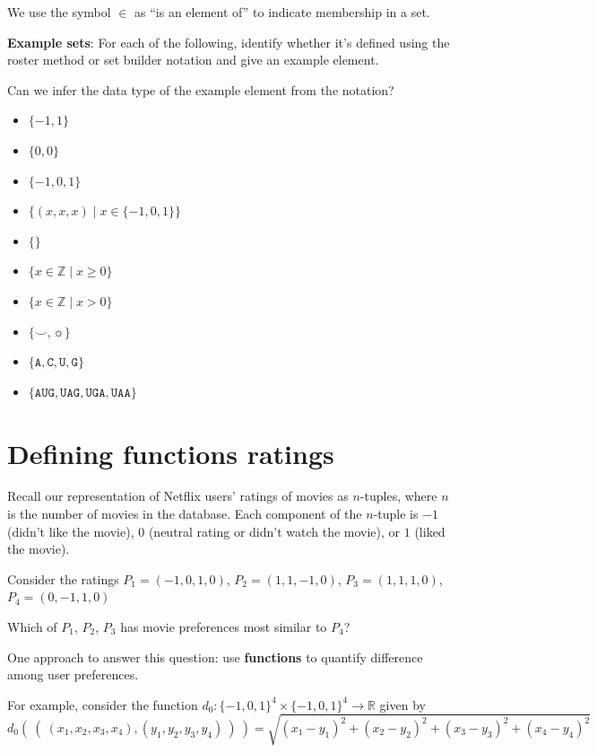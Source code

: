 \documentclass[12pt, oneside]{article}
\newcommand{\A}[0]{\texttt{A}}
\newcommand{\C}[0]{\texttt{C}}
\newcommand{\G}[0]{\texttt{G}}
\newcommand{\U}[0]{\texttt{U}}
\begin{document}
\vfill

We use the symbol $\in$ as ``is an element of'' to indicate membership in a set.\\

\newpage 

{\bf Example sets}: For each of the following, identify whether it's defined using the roster method
or set builder notation and give an example element.

Can we infer the data type of the example element from the notation?

\begin{itemize}
    \item[]$\{ -1, 1\}$
    \vfill
    \item[]$\{0, 0 \}$
    \vfill
    \item[]$\{-1, 0, 1 \}$
    \vfill
    \item[]$\{(x,x,x) \mid x \in \{-1,0,1\} \}$
    \vfill
    \item[]$\{ \}$
    \vfill
    \item[]$\{ x \in \mathbb{Z} \mid x \geq 0 \}$
    \vfill
    \item[]$\{ x \in \mathbb{Z}  \mid x > 0 \}$
    \vfill
    \item[]$\{ \smile, \sun \}$
    \vfill
    \item[]$\{\A,\C,\U,\G\}$
    \vfill
    \item[]$\{\A\U\G, \U\A\G, \U\G\A, \U\A\A \}$
    \vfill
\end{itemize}
 \vfill
\section*{Defining functions ratings}


Recall our representation of Netflix users' ratings of movies as $n$-tuples, where
$n$ is the number of movies in the database. 
Each component of the $n$-tuple is $-1$ (didn't like the movie), $0$ 
(neutral rating or didn't watch the movie), or $1$ (liked the movie).

Consider the ratings $P_1 = (-1, 0, 1, 0)$, $P_2 = (1, 1, -1, 0)$, $P_3 = (1, 1, 1, 0)$,
$P_4 = (0,-1,1, 0)$


Which of $P_1$, $P_2$, $P_3$ has movie preferences most similar to $P_4$?

One approach to answer this question: use {\bf functions} to quantify difference among user preferences.

For example, consider the function 
$d_0: \{-1,0,1\}^4 \times \{-1,0,1\}^4 \to \mathbb{R}$
given by
\[
d_0 (~(~ (x_1, x_2, x_3, x_4), (y_1, y_2, y_3, y_4) ~) ~) = \sqrt{ (x_1 - y_1)^2 + (x_2 - y_2)^2 + (x_3 -y_3)^2 + (x_4 -y_4)^2}
\]
\end{document}
